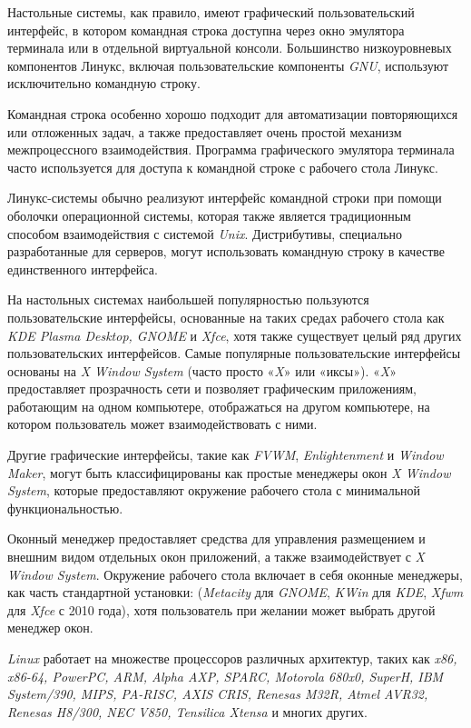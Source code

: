 Настольные системы, как правило, имеют графический пользовательский интерфейс, в котором командная строка доступна через окно эмулятора терминала или в отдельной виртуальной консоли. Большинство низкоуровневых компонентов Линукс, включая пользовательские компоненты \textit{GNU}, используют исключительно командную строку.

Командная строка особенно хорошо подходит для автоматизации повторяющихся или отложенных задач, а также предоставляет очень простой механизм межпроцессного взаимодействия. Программа графического эмулятора терминала часто используется для доступа к командной строке с рабочего стола Линукс.

Линукс-системы обычно реализуют интерфейс командной строки при помощи оболочки операционной системы, которая также является традиционным способом взаимодействия с системой \textit{Unix}. Дистрибутивы, специально разработанные для серверов, могут использовать командную строку в качестве единственного интерфейса.

На настольных системах наибольшей популярностью пользуются пользовательские интерфейсы, основанные на таких средах рабочего стола как \textit{KDE Plasma Desktop, GNOME} и \textit{Xfce}, хотя также существует целый ряд других пользовательских интерфейсов. Самые популярные пользовательские интерфейсы основаны на \textit{X Window System} (часто просто «\textit{X}» или «иксы»). «\textit{X}» предоставляет прозрачность сети и позволяет графическим приложениям, работающим на одном компьютере, отображаться на другом компьютере, на котором пользователь может взаимодействовать с ними.

Другие графические интерфейсы, такие как \textit{FVWM}, \textit{Enlightenment} и \textit{Window Maker}, могут быть классифицированы как простые менеджеры окон \textit{X Window System}, которые предоставляют окружение рабочего стола с минимальной функциональностью.

Оконный менеджер предоставляет средства для управления размещением и внешним видом отдельных окон приложений, а также взаимодействует с \textit{X Window System}. Окружение рабочего стола включает в себя оконные менеджеры, как часть стандартной установки: (\textit{Metacity} для \textit{GNOME}, \textit{\textit{KWin}} для \textit{KDE}, \textit{Xfwm} для \textit{Xfce} с 2010 года), хотя пользователь при желании может выбрать другой менеджер окон.

\textit{Linux} работает на множестве процессоров различных архитектур, таких как \textit{x86, x86-64, PowerPC, ARM, Alpha AXP, SPARC, Motorola 680x0, SuperH, IBM System/390, MIPS, PA-RISC, AXIS CRIS, Renesas M32R, Atmel AVR32, Renesas H8/300, NEC V850, Tensilica Xtensa} и многих других.

